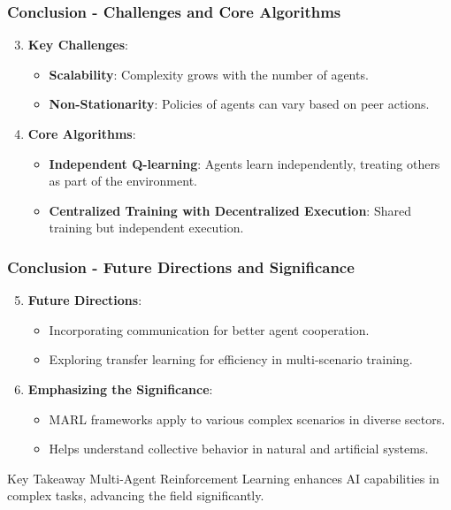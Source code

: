 \documentclass[aspectratio=169]{beamer}
\begin{document}
\begin{frame}[fragile]
    \frametitle{Conclusion - Challenges and Core Algorithms}
    \begin{enumerate}
        \setcounter{enumi}{2}
        \item \textbf{Key Challenges}:
        \begin{itemize}
            \item \textbf{Scalability}: Complexity grows with the number of agents.
            \item \textbf{Non-Stationarity}: Policies of agents can vary based on peer actions.
        \end{itemize}

        \item \textbf{Core Algorithms}:
        \begin{itemize}
            \item \textbf{Independent Q-learning}: Agents learn independently, treating others as part of the environment.
            \item \textbf{Centralized Training with Decentralized Execution}: Shared training but independent execution.
        \end{itemize}
    \end{enumerate}
\end{frame}

\begin{frame}[fragile]
    \frametitle{Conclusion - Future Directions and Significance}
    \begin{enumerate}
        \setcounter{enumi}{4}
        \item \textbf{Future Directions}:
        \begin{itemize}
            \item Incorporating communication for better agent cooperation.
            \item Exploring transfer learning for efficiency in multi-scenario training.
        \end{itemize}

        \item \textbf{Emphasizing the Significance}:
        \begin{itemize}
            \item MARL frameworks apply to various complex scenarios in diverse sectors.
            \item Helps understand collective behavior in natural and artificial systems.
        \end{itemize}
    \end{enumerate}
    
    \begin{block}{Key Takeaway}
        Multi-Agent Reinforcement Learning enhances AI capabilities in complex tasks, advancing the field significantly.
    \end{block}
\end{frame}
\end{document}
